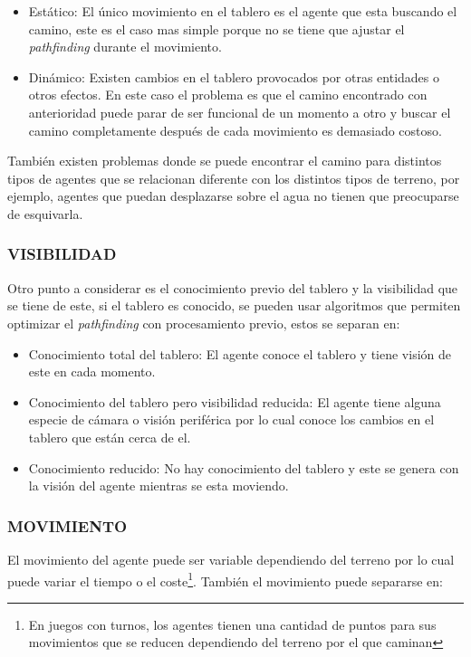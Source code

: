 \begin{itemize}
    \item Estático: El único movimiento en el tablero es el agente que esta buscando el camino, este es el caso mas simple porque no se tiene que ajustar el \textit{pathfinding} durante el movimiento.
    \item Dinámico: Existen cambios en el tablero provocados por otras entidades o otros efectos. En este caso el problema es que el camino encontrado con anterioridad puede parar de ser funcional de un momento a otro y buscar el camino completamente después de cada movimiento es demasiado costoso.
\end{itemize}

También existen problemas donde se puede encontrar el camino para distintos tipos de agentes que se relacionan diferente con los distintos tipos de terreno, por ejemplo, agentes que puedan desplazarse sobre el agua no tienen que preocuparse de esquivarla.

\subsubsection{VISIBILIDAD}

Otro punto a considerar es el conocimiento previo del tablero y la visibilidad que se tiene de este, si el tablero es conocido, se pueden usar algoritmos que permiten optimizar el \textit{pathfinding} con procesamiento previo, estos se separan en:

\begin{itemize}
    \item Conocimiento total del tablero: El agente conoce el tablero y tiene visión de este en cada momento.
    
    \item Conocimiento del tablero pero visibilidad reducida: El agente tiene alguna especie de cámara o visión periférica por lo cual conoce los cambios en el tablero que están cerca de el.
    
    \item Conocimiento reducido: No hay conocimiento del tablero y este se genera con la visión del agente mientras se esta moviendo.
\end{itemize}

\subsubsection{MOVIMIENTO}

El movimiento del agente puede ser variable dependiendo del terreno por lo cual puede variar el tiempo o el coste\footnote{En juegos con turnos, los agentes tienen una cantidad de puntos para sus movimientos que se reducen dependiendo del terreno por el que caminan}. También el movimiento puede separarse en:

